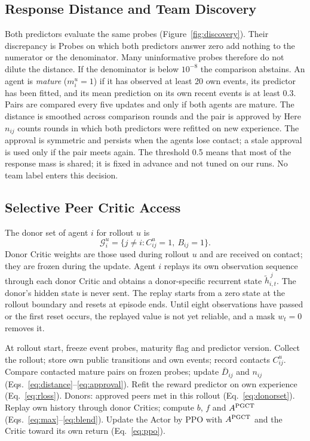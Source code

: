 \documentclass{article}
\begin{document}
\subsection{Response Distance and Team Discovery}
Both predictors evaluate the same probes (Figure~\ref{fig:discovery}). Their discrepancy is
\DistanceEquation
Probes on which both predictors answer zero add nothing to the numerator or the denominator. Many uninformative probes therefore do not dilute the distance. If the denominator is below $10^{-8}$ the comparison abstains. An agent is \emph{mature} ($m_i^u=1$) if it has observed at least 20 own events, its predictor has been fitted, and its mean prediction on its own recent events is at least 0.3. Pairs are compared every five updates and only if both agents are mature. The distance is smoothed across comparison rounds and the pair is approved by
\ApprovalEquation
Here $n_{ij}$ counts rounds in which both predictors were refitted on new experience. The approval is symmetric and persists when the agents lose contact; a stale approval is used only if the pair meets again. The threshold 0.5 means that most of the response mass is shared; it is fixed in advance and not tuned on our runs. No team label enters this decision.

\subsection{Selective Peer Critic Access}
The donor set of agent $i$ for rollout $u$ is
\begin{equation}\label{eq:donorset}
\mathcal G_i^u=\{j\ne i: C_{ij}^u=1,\ B_{ij}=1\}.
\end{equation}
Donor Critic weights are those used during rollout $u$ and are received on contact; they are frozen during the update. Agent $i$ replays its own observation sequence through each donor Critic and obtains a donor-specific recurrent state $\tilde h^{\,j}_{i,t}$. The donor's hidden state is never sent. The replay starts from a zero state at the rollout boundary and resets at episode ends. Until eight observations have passed or the first reset occurs, the replayed value is not yet reliable, and a mask $w_t=0$ removes it.

\begin{algorithm}[tb]
\caption{One PGCT update of agent $i$}
\label{alg:pgct}
\begin{algorithmic}[1]
\STATE At rollout start, freeze event probes, maturity flag and predictor version.
\STATE Collect the rollout; store own public transitions and own events; record contacts $C^u_{ij}$.
\STATE Compare contacted mature pairs on frozen probes; update $\bar D_{ij}$ and $n_{ij}$ (Eqs.~\ref{eq:distance}--\ref{eq:approval}).
\STATE Refit the reward predictor on own experience (Eq.~\ref{eq:rloss}).
\ENDIF
\STATE Donors: approved peers met in this rollout (Eq.~\ref{eq:donorset}).
\STATE Replay own history through donor Critics; compute $b$, $f$ and $A^{\rm PGCT}$ (Eqs.~\ref{eq:max}--\ref{eq:blend}).
\STATE Update the Actor by PPO with $A^{\rm PGCT}$ and the Critic toward its own return (Eq.~\ref{eq:ppo}).
\end{algorithmic}
\end{algorithm}
\end{document}
